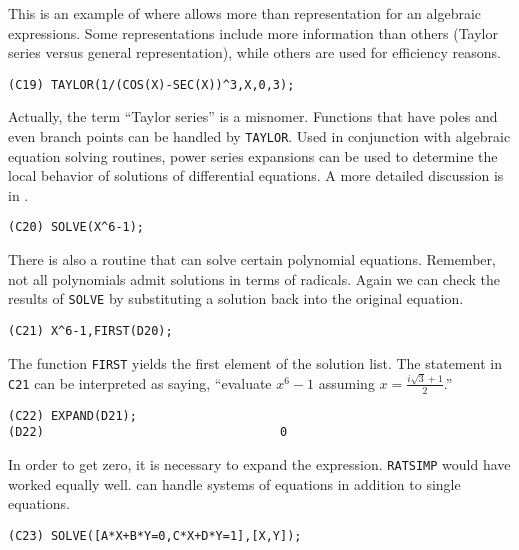 This is an example of where {\Macsyma} allows more than representation
for an algebraic expressions.  Some representations include more
information than others (Taylor series versus general representation),
while others are used for efficiency reasons.

\begin{verbatim}
(C19) TAYLOR(1/(COS(X)-SEC(X))^3,X,0,3);
\end{verbatim}
Actually, the term ``Taylor series'' is a misnomer.  Functions that have
poles and even branch points can be handled by {\tt TAYLOR}.  Used in
conjunction with algebraic equation solving routines, power series
expansions can be used to determine the local behavior of solutions of
differential equations.  A more detailed discussion is in
.  
\begin{verbatim}
(C20) SOLVE(X^6-1);
\end{verbatim}

There is also a routine that can solve certain polynomial equations.
Remember, not all polynomials admit solutions in terms of radicals.
Again we can check the results of {\tt SOLVE} by substituting a solution
back into the original equation.
\begin{verbatim}
(C21) X^6-1,FIRST(D20);
\end{verbatim}
The function {\tt FIRST} yields the first element of the solution list.
The statement in {\tt C21} can be interpreted as saying, ``evaluate
$x^6 - 1$ assuming $x = \frac{i \sqrt{3} + 1}{2}$.''
\begin{verbatim}
(C22) EXPAND(D21);
(D22)                                 0
\end{verbatim}
In order to get zero, it is necessary to expand the expression.  {\tt RATSIMP}
would have worked equally well.  {\Macsyma} can handle systems of equations 
in addition to single equations.
\begin{verbatim}
(C23) SOLVE([A*X+B*Y=0,C*X+D*Y=1],[X,Y]);
\end{verbatim}

